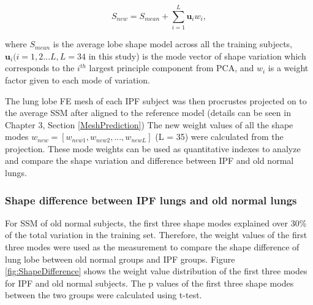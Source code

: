 \begin{equation}
 \label{eq:FissurePrediction1}
 S_{new} = S_{mean} + \sum_{i=1}^L \mathbf{u}_i w_{i},
\end{equation}

\noindent where $S_{mean}$ is the average lobe shape model across all the training subjects, $\mathbf{u}_i (i = 1,2...L, L=34$ in this study) is the mode vector of shape variation which corresponds to the $i^{th}$ largest principle component from PCA, and $w_{i}$ is a weight factor given to each mode of variation. 

The lung lobe FE mesh of each IPF subject was then procrustes projected on to the average SSM after aligned to the reference model (details can be seen in Chapter 3, Section \ref{MeshPrediction}) The new weight values of all the shape modes $w_{new} = [w_{new1}, w_{new2},...,w_{newL}]$ (L = 35) were calculated from the projection. These mode weights can be used as quantitative indexes to analyze and compare the shape variation and difference between IPF and old normal lungs.

\subsubsection{Shape difference between IPF lungs and old normal lungs}

For SSM of old normal subjects, the first three shape modes explained over 30\% of the total variation in the training set. Therefore, the weight values of the first three modes were used as the measurement to compare the shape difference of lung lobe between old normal groups and IPF groups. Figure \ref{fig:ShapeDifference} shows the weight value distribution of the first three modes for IPF and old normal subjects. The p values of the first three shape modes between the two groups were calculated using t-test.

